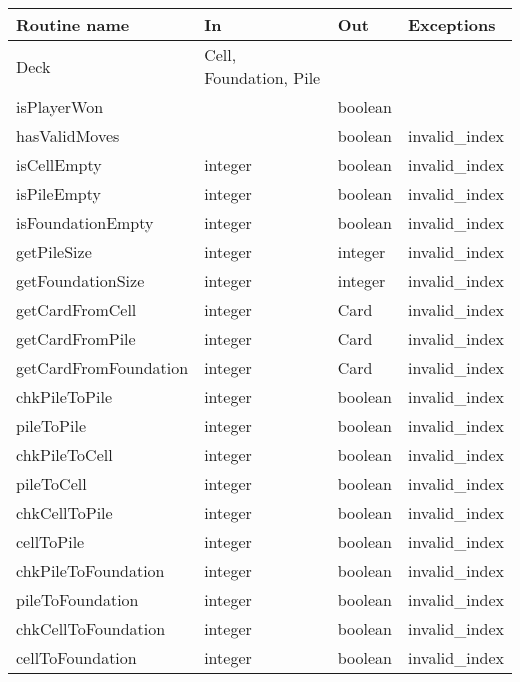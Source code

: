 \documentclass[12pt,fleqn]{article}
\begin{document}
\begin{tabular}{| l | l | l | l |}
\hline
\textbf{Routine name} & \textbf{In} & \textbf{Out} & \textbf{Exceptions}\\
\hline
Deck & Cell, Foundation, Pile & ~ & ~\\
\hline
isPlayerWon & ~ & boolean & ~\\
\hline
hasValidMoves & ~ & boolean & invalid\_index\\
\hline
isCellEmpty & integer & boolean & invalid\_index\\
\hline
isPileEmpty & integer & boolean & invalid\_index\\
\hline
isFoundationEmpty & integer & boolean & invalid\_index \\
\hline
getPileSize & integer & integer & invalid\_index \\
\hline

getFoundationSize & integer & integer & invalid\_index \\
\hline

getCardFromCell & integer & Card & invalid\_index \\
\hline

getCardFromPile & integer & Card &invalid\_index \\
\hline

getCardFromFoundation & integer & Card &invalid\_index \\
\hline

chkPileToPile & integer & boolean & invalid\_index\\
\hline

pileToPile & integer & boolean & invalid\_index\\
\hline

chkPileToCell & integer & boolean & invalid\_index\\
\hline

pileToCell & integer & boolean &invalid\_index \\
\hline

chkCellToPile & integer & boolean & invalid\_index\\
\hline

cellToPile & integer & boolean &invalid\_index \\
\hline

chkPileToFoundation & integer & boolean & invalid\_index\\
\hline

pileToFoundation & integer & boolean &invalid\_index \\
\hline

chkCellToFoundation & integer & boolean & invalid\_index\\
\hline

cellToFoundation & integer & boolean & invalid\_index\\
\hline

\end{tabular}
\end{document}
